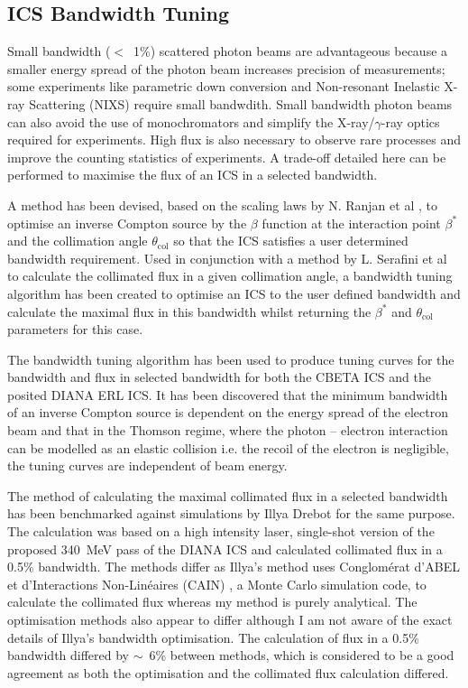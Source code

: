 \documentclass[10pt]{article}
\begin{document}
\subsection*{ICS Bandwidth Tuning}

Small bandwidth ($<$~1\%) scattered photon beams are advantageous because a smaller energy spread of the photon beam increases precision of measurements; some experiments like parametric down conversion \cite{eisenberger1971x} and Non-resonant Inelastic  X-ray  Scattering (NIXS) require small bandwdith. Small bandwidth photon beams can also avoid the use of monochromators and simplify the X-ray/$\gamma$-ray optics required for experiments. High flux is also necessary to observe rare processes and improve the counting statistics of experiments. A trade-off detailed here can be performed to maximise the flux of an ICS in a selected bandwidth.  

A method has been devised, based on the scaling laws by N. Ranjan et  al \cite{ranjan2018simulation}, to optimise an inverse Compton source by the $\beta$ function at the interaction point $\beta^{*}$ and the collimation angle $\theta_{\mathrm{col}}$ so that the ICS satisfies a user determined bandwidth requirement. Used in conjunction with a method by L. Serafini et al \cite{curatolo2017analytical} to calculate the collimated flux in a given collimation angle, a bandwidth tuning algorithm has been created to optimise an ICS to the user defined bandwidth and calculate the maximal flux in this bandwidth whilst returning the $\beta^{*}$ and $\theta_{\mathrm{col}}$ parameters for this case.

The bandwidth tuning algorithm has been used to produce tuning curves for the bandwidth and flux in selected bandwidth for both the CBETA ICS and the posited DIANA ERL ICS. It has been discovered that the minimum bandwidth of an inverse Compton source is dependent on the energy spread of the electron beam and that in the Thomson regime, where the photon -- electron interaction can be modelled as an elastic collision i.e. the recoil of the electron is negligible, the tuning curves are independent of beam energy.


The method of calculating the maximal collimated flux in a selected bandwidth has been benchmarked against simulations by Illya Drebot for the same purpose. The calculation was based on a high intensity laser, single-shot version of the proposed 340~MeV pass of the DIANA ICS and calculated collimated flux in a 0.5\% bandwidth. The methods differ as Illya's method uses Conglom\'{e}rat d’ABEL et d’Interactions Non-Lin\'{e}aires (CAIN) \cite{chen1995cain}, a Monte Carlo simulation code, to calculate the collimated flux whereas my method is purely analytical. The optimisation methods also appear to differ although I am not aware of the exact details of Illya's bandwidth optimisation. The calculation of flux in a 0.5\% bandwidth differed by $\sim$~6\% between methods, which is considered to be a good agreement as both the optimisation and the collimated flux calculation differed.
\end{document}
